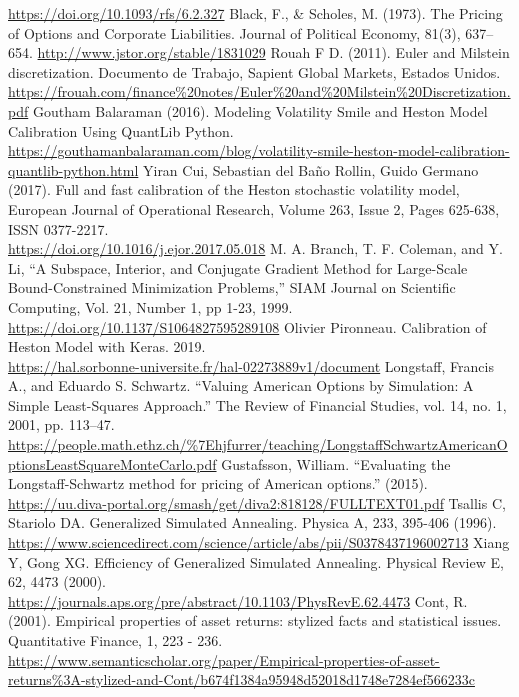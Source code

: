 \documentclass[12pt,a4paper,twoside,openany]{book}
\begin{document}
\begin{thebibliography}{unsrt}
 			\url{https://doi.org/10.1093/rfs/6.2.327}
 			Black, F., \& Scholes, M. (1973). The Pricing of Options and Corporate Liabilities. Journal of Political Economy, 81(3), 637–654. \url{http://www.jstor.org/stable/1831029}
 			Rouah F D. (2011). Euler and Milstein discretization. Documento de Trabajo, Sapient Global Markets, Estados Unidos.\\
 			\url{https://frouah.com/finance%20notes/Euler%20and%20Milstein%20Discretization.pdf}
 			Goutham Balaraman (2016). Modeling Volatility Smile and Heston Model Calibration Using QuantLib Python.\\
 			\url{https://gouthamanbalaraman.com/blog/volatility-smile-heston-model-calibration-quantlib-python.html}
 			Yiran Cui, Sebastian del Baño Rollin, Guido Germano (2017). Full and fast calibration of the Heston stochastic volatility model,
 			European Journal of Operational Research, Volume 263, Issue 2, Pages 625-638, ISSN 0377-2217.\\
 			\url{https://doi.org/10.1016/j.ejor.2017.05.018}
 			M. A. Branch, T. F. Coleman, and Y. Li, “A Subspace, Interior, and Conjugate Gradient Method for Large-Scale Bound-Constrained Minimization Problems,” SIAM Journal on Scientific Computing, Vol. 21, Number 1, pp 1-23, 1999.\\
 			\url{https://doi.org/10.1137/S1064827595289108}
 			Olivier Pironneau. Calibration of Heston Model with Keras. 2019.\\
 			\url{https://hal.sorbonne-universite.fr/hal-02273889v1/document}
 			Longstaff, Francis A., and Eduardo S. Schwartz. “Valuing American Options by Simulation: A Simple Least-Squares Approach.” The Review of Financial Studies, vol. 14, no. 1, 2001, pp. 113–47.\\
 			\url{https://people.math.ethz.ch/%7Ehjfurrer/teaching/LongstaffSchwartzAmericanOptionsLeastSquareMonteCarlo.pdf}	
 			Gustafsson, William. “Evaluating the Longstaff-Schwartz method for pricing of American options.” (2015).\\
 			\url{https://uu.diva-portal.org/smash/get/diva2:818128/FULLTEXT01.pdf}
 			Tsallis C, Stariolo DA. Generalized Simulated Annealing. Physica A, 233, 395-406 (1996).\\
 			\url{https://www.sciencedirect.com/science/article/abs/pii/S0378437196002713}
 			Xiang Y, Gong XG. Efficiency of Generalized Simulated Annealing. Physical Review E, 62, 4473 (2000).\\
 			\url{https://journals.aps.org/pre/abstract/10.1103/PhysRevE.62.4473}
 			Cont, R. (2001). Empirical properties of asset returns: stylized facts and statistical issues. Quantitative Finance, 1, 223 - 236.\\
 			\url{https://www.semanticscholar.org/paper/Empirical-properties-of-asset-returns%3A-stylized-and-Cont/b674f1384a95948d52018d1748e7284ef566233c}
 		
 	\end{thebibliography}
\end{document}
